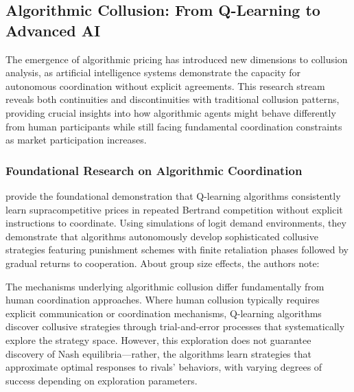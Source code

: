 \subsection{Algorithmic Collusion: From Q-Learning to Advanced AI}

The emergence of algorithmic pricing has introduced new dimensions to collusion analysis, as artificial intelligence systems demonstrate the capacity for autonomous coordination without explicit agreements. This research stream reveals both continuities and discontinuities with traditional collusion patterns, providing crucial insights into how algorithmic agents might behave differently from human participants while still facing fundamental coordination constraints as market participation increases.

\subsubsection*{Foundational Research on Algorithmic Coordination}

\textcite{calvano_artificial_2020} provide the foundational demonstration that Q-learning algorithms consistently learn supracompetitive prices in repeated Bertrand competition without explicit instructions to coordinate. Using simulations of logit demand environments, they demonstrate that algorithms autonomously develop sophisticated collusive strategies featuring punishment schemes with finite retaliation phases followed by gradual returns to cooperation. About group size effects, the authors \parencite*[p. 3268]{calvano_artificial_2020} note: 

    \begin{quote}
    \end{quote}

The mechanisms underlying algorithmic collusion differ fundamentally from human coordination approaches. Where human collusion typically requires explicit communication or coordination mechanisms, Q-learning algorithms discover collusive strategies through trial-and-error processes that systematically explore the strategy space. However, this exploration does not guarantee discovery of Nash equilibria---rather, the algorithms learn strategies that approximate optimal responses to rivals' behaviors, with varying degrees of success depending on exploration parameters.

